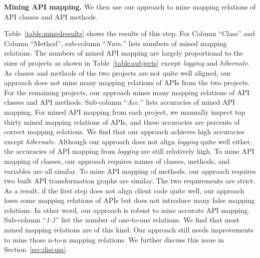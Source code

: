 \textbf{Mining API mapping.} We then use our approach to mine
mapping relations of API classes and API methods.

Table~\ref{table:minedresults} shows the results of this step. For
Column ``Class'' and Column ``Method'', sub-column ``\emph{Num.}''
lists numbers of mined mapping relations. The numbers of mined API
mapping are largely proportional to the sizes of projects as shown
in Table~\ref{table:subjects} except \emph{logging} and
\emph{hibernate}. As classes and methods of the two projects are not
quite well aligned, our approach does not mine many mapping
relations of APIs from the two projects. For the remaining projects,
our approach mines many mapping relations of API classes and API
methods. Sub-column ``\emph{Acc.}'' lists accuracies of mined API
mapping. For mined API mapping from each project, we manually
inspect top thirty mined mapping relations of APIs, and these
accuracies are percents of correct mapping relations. We find that
our approach achieves high accuracies except \emph{hibernate}.
Although our approach does not align \emph{logging} quite well
either, the accuracies of API mapping from \emph{logging} are still
relatively high. To mine API mapping of classes, our approach
requires names of classes, methods, and variables are all similar.
To mine API mapping of methods, our approach requires two built API
transformation graphs are similar. The two requirements are strict.
As a result, if the first step does not align client code quite
well, our approach loses some mapping relations of APIs but does not
introduce many false mapping relations. In other word, our approach
is robust to mine accurate API mapping. Sub-column ``\emph{1-1}''
list the number of one-to-one relations. We find that most mined
mapping relations are of this kind. Our approach still needs
improvements to mine those n-to-n mapping relations. We further
discuss this issue in Section~\ref{sec:discuss}.


